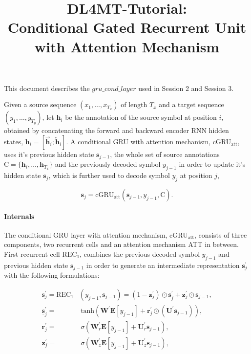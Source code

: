 \documentclass[11pt, oneside]{article}
\title{DL4MT-Tutorial: \\Conditional Gated Recurrent Unit with Attention Mechanism}
\date{\vspace{-8ex}}
\theoremstyle{definition}
\newcommand{\vect}[1]{\mathbf{#1}}
\newcommand{\matr}[1]{\mathbf{#1}}
\newcommand{\vh}[0]{\vect{h}}
\newcommand{\vz}[0]{\vect{z}}
\newcommand{\vs}[0]{\vect{s}}
\newcommand{\vr}[0]{\vect{r}}
\newcommand{\mW}[0]{\matr{W}}
\newcommand{\mE}[0]{\matr{E}}
\newcommand{\mU}[0]{\matr{U}}
\newcommand{\ola}{\overleftarrow}
\newcommand{\ora}{\overrightarrow}
\begin{document}
\maketitle

This document describes the $gru\_cond\_layer$ used in Session 2 and Session 3.

Given a source sequence $(x_1, \dots,x_{T_x})$ of length $T_x$ and a target
sequence $(y_1,\dots,y_{T_y})$, let $\vh_i$ be the annotation of the source symbol 
at position $i$, obtained by concatenating the forward and backward encoder RNN 
hidden states, $\vh_i = [ \ora{\vh}_i; \ola{\vh}_i ]$. A conditional GRU with attention 
mechanism, cGRU$_{\text{att}}$, uses it's previous hidden state $\vs_{j-1}$, the 
whole set of source annotations $\text{C}=\lbrace\vh_i, \dots, \vh_{T_x}\rbrace$ and 
the previously decoded symbol $y_{j-1}$ in order to update it's hidden state $\vs_j$, 
which is further used to decode symbol $y_j$ at position $j$,

\begin{equation}
	\vs_j = \text{cGRU}_{\text{att}}\left(  \vs_{j-1}, y_{j-1}, \text{C}  \right).
\end{equation}

\paragraph{Internals} The conditional GRU layer with attention mechanism, 
cGRU$_{\text{att}}$, consists of three components, two 
recurrent cells and an attention mechanism ATT in between. 
First recurrent cell $\text{REC}_1$, combines the previous decoded symbol $y_{j-1}$ 
and previous hidden state $\vs_{j-1}$ in order to generate an intermediate 
representation $\vs^{\prime}_j$ with the following formulations:

\vspace{-10px}
\begin{align}
	\vs_j^{\prime} = \text{REC}_1 &  \left( y_{j-1}, \vs_{j-1}  \right) = (1 - \vz_j^{\prime}) \odot \underline{\vs}_j^{\prime} + \vz_j^{\prime} \odot \vs_{j-1},	 \\
	\underline{\vs}_j^{\prime} =& ~\text{tanh} \left(   \mW^{\prime} \mE[y_{j-1}] + \vr_j^{\prime} \odot (\mU^{\prime}\vs_{j-1})  \right), \\
	\vr_j^{\prime} =& ~ \sigma \left(  \mW_r^{\prime} \mE[y_{j-1}] + \mU_r^{\prime} \vs_{j-1}  \right), \\
	\vz_j^{\prime} =& ~ \sigma \left(  \mW_z^{\prime} \mE[y_{j-1}] + \mU_z^{\prime} \vs_{j-1}  \right),
\end{align}
\end{document}
